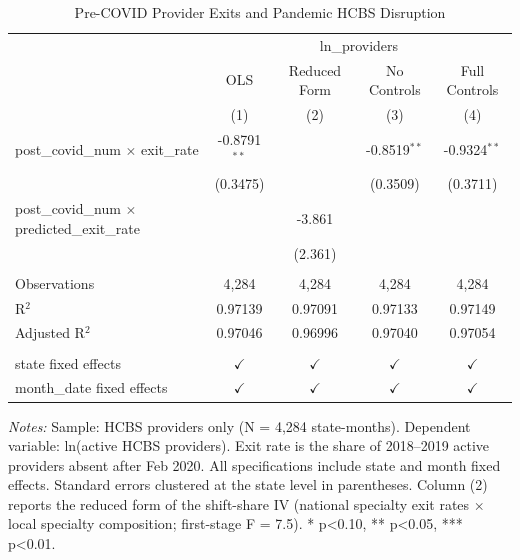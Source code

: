 
\begin{table}[htbp]
   \caption{\label{tab:main} Pre-COVID Provider Exits and Pandemic HCBS Disruption}
   \bigskip
   \centering
   \begin{tabular}{lcccc}
      \toprule
       & \multicolumn{4}{c}{ln\_providers}\\
                                                           & OLS            & Reduced Form  & No Controls    & Full Controls \\   
                                                           & (1)            & (2)           & (3)            & (4)\\  
      \midrule 
      post\_covid\_num $\times$ exit\_rate                 & -0.8791$^{**}$ &               & -0.8519$^{**}$ & -0.9324$^{**}$\\   
                                                           & (0.3475)       &               & (0.3509)       & (0.3711)\\   
      post\_covid\_num $\times$ predicted\_exit\_rate      &                & -3.861        &                &   \\   
                                                           &                & (2.361)       &                &   \\   
       \\
      Observations                                         & 4,284          & 4,284         & 4,284          & 4,284\\  
      R$^2$                                                & 0.97139        & 0.97091       & 0.97133        & 0.97149\\  
      Adjusted R$^2$                                       & 0.97046        & 0.96996       & 0.97040        & 0.97054\\  
       \\
      state fixed effects                                  & $\checkmark$   & $\checkmark$  & $\checkmark$   & $\checkmark$\\   
      month\_date fixed effects                            & $\checkmark$   & $\checkmark$  & $\checkmark$   & $\checkmark$\\   
      \bottomrule
   \end{tabular}
   
   \par \raggedright 
   \textit{Notes:} Sample: HCBS providers only (N = 4,284 state-months). Dependent variable: ln(active HCBS providers). Exit rate is the share of 2018--2019 active providers absent after Feb 2020. All specifications include state and month fixed effects. Standard errors clustered at the state level in parentheses. Column (2) reports the reduced form of the shift-share IV (national specialty exit rates $\times$ local specialty composition; first-stage F = 7.5). * p<0.10, ** p<0.05, *** p<0.01.
\end{table}


